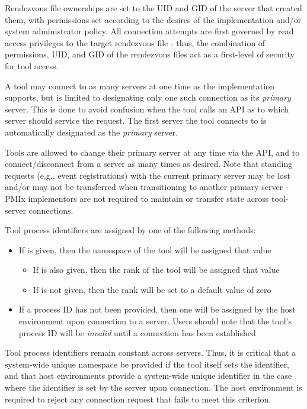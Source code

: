 Rendezvous file ownerships are set to the \ac{UID} and \ac{GID} of the server that created them, with permissions set according to the desires of the implementation and/or system administrator policy. All connection attempts are first governed by read access privileges to the target rendezvous file - thus, the combination of permissions, \ac{UID}, and \ac{GID} of the rendezvous files act as a first-level of security for tool access.

A tool may connect to as many servers at one time as the implementation supports, but is limited to designating only one such connection as its \emph{primary} server. This is done to avoid confusion when the tool calls an \ac{API} as to which server should service the request. The first server the tool connects to is automatically designated as the \emph{primary} server.

Tools are allowed to change their primary server at any time via the  \ac{API}, and to connect/disconnect from a server as many times as desired. Note that standing requests (e.g., event registrations) with the current primary server may be lost and/or may not be transferred when transitioning to another primary server - \ac{PMIx} implementors are not required to maintain or transfer state across tool-server connections.

Tool process identifiers are assigned by one of the following methods:

\begin{itemize}
    \item If  is given, then the namespace of the tool will be assigned that value
    \begin{itemize}
        \item If  is also given, then the rank of the tool will be assigned that value
        \item If  is not given, then the rank will be set to a default value of zero
    \end{itemize}
    \item If a process ID has not been provided, then one will be assigned by the host environment upon connection to a server. Users should note that the tool's process ID will be \emph{invalid} until a connection has been established
\end{itemize}

Tool process identifiers remain constant across servers. Thus, it is critical that a system-wide unique namespace be provided if the tool itself sets the identifier, and that host environments provide a system-wide unique identifier in the case where the identifier is set by the server upon connection. The host environment is required to reject any connection request that fails to meet this criterion.

